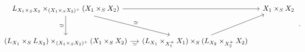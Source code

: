 \[
\begin{tikzcd}[column sep=small,row sep=large]
  L_{X_1\times_S X_2}
    \times_{(X_1\times_S X_2)^+}
    (X_1\times_S X_2)
    \arrow[rr]
    \arrow[d,"\simeq"']
    \arrow[dr,"\simeq"]
  &&
  X_1\times_S X_2
  \\
  (L_{X_1}\times_S L_{X_2})
    \times_{(X_1\times_S X_2)^+}
    (X_1\times_S X_2)
    \arrow[r,"\simeq"']
  &
  (L_{X_1}\times_{X_1^+}X_1)
    \times_S
    (L_{X_2}\times_{X_2^+}X_2)
    \arrow[ur]
  &
  {}
\end{tikzcd}
\,.
\]
